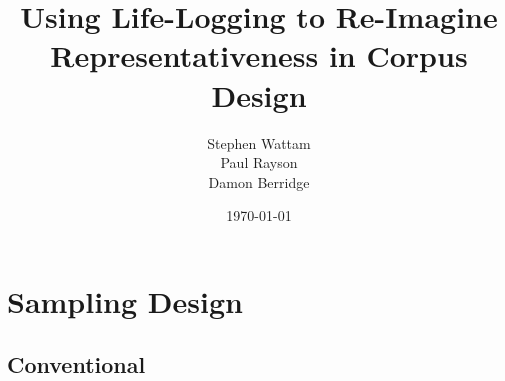\documentclass[xcolor=x11names,compress,handout]{beamer}
\title{Using Life-Logging to Re-Imagine Representativeness in Corpus Design}
\author{Stephen Wattam\\
Paul Rayson\\
Damon Berridge}
\institute[2013]{Lancaster University}
\date{\tiny \today}
\begin{document}
\maketitle





% 
% 
% 
% 
%                     
% 
% 
% 

\section{Sampling Design}

\subsection{Conventional}
\end{document}
